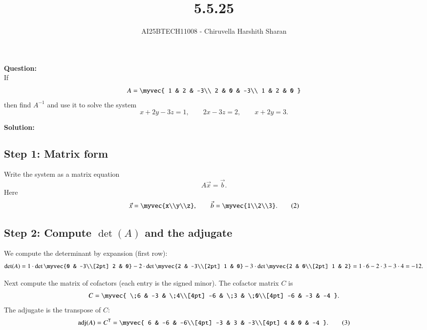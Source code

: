 \documentclass[journal]{IEEEtran}
\begin{document}

\vspace{2cm}

\title{5.5.25}
\author{AI25BTECH11008 - Chiruvella Harshith Sharan}
{\let\newpage\relax\maketitle}

\textbf{Question:} \\

If
\[
A = \myvec{
1 & 2 & -3\\
2 & 0 & -3\\
1 & 2 & 0
}
\]
then find \(A^{-1}\) and use it to solve the system
\[
x + 2y - 3z = 1,\qquad 2x - 3z = 2,\qquad x + 2y = 3.
\]

\vspace{0.3cm}
\textbf{Solution:}

\subsection*{Step 1: Matrix form}
Write the system as a matrix equation
\[
A\vec{x} = \vec{b}. \tag{1}
\]
Here
\[
\vec{x} = \myvec{x\\y\\z},\qquad \vec{b}=\myvec{1\\2\\3}. \tag{2}
\]

\subsection*{Step 2: Compute \(\det(A)\) and the adjugate}
We compute the determinant by expansion (first row):
\[
\det(A)=
1\cdot\det\myvec{0 & -3\\[2pt] 2 & 0}
-2\cdot\det\myvec{2 & -3\\[2pt] 1 & 0}
-3\cdot\det\myvec{2 & 0\\[2pt] 1 & 2}
=1\cdot 6 -2\cdot 3 -3\cdot 4 = -12.
\]

Next compute the matrix of cofactors (each entry is the signed minor). The cofactor matrix \(C\) is
\[
C = \myvec{
\;6 & -3 & \;4\\[4pt]
-6 & \;3 & \;0\\[4pt]
-6 & -3 & -4
}.
\]
The adjugate is the transpose of \(C\):
\[
\operatorname{adj}(A)=C^{\mathsf T}=
\myvec{
6 & -6 & -6\\[4pt]
-3 & 3 & -3\\[4pt]
4 & 0 & -4
}. \tag{3}
\]
\end{document}
